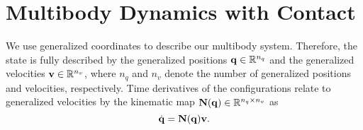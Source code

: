 \section{Multibody Dynamics with Contact}
\label{sec:multibody_dynamics_with_contact}

We use generalized coordinates to describe our multibody system. Therefore, the
state is fully described by the generalized positions
${\mathbf{q}}\in\mathbb{R}^{n_q}$ and the generalized velocities
${\mathbf{v}}\in\mathbb{R}^{n_v}$, where $n_q$ and $n_v$ denote the number of
generalized positions and velocities, respectively. Time derivatives of the
configurations relate to generalized velocities by the kinematic map ${\mathbf{N}}({\mathbf{q}})\in\mathbb{R}^{n_q\times
n_v}$ as
\begin{equation}
    \dot{\mf{q}}=\mf{N}(\mf{q})\mf{v}.
    \label{eq:v_to_qdot}
\end{equation}





